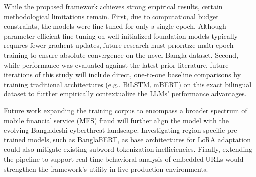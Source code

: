 \documentclass[journal]{IEEEtran}
\begin{document}
While the proposed framework achieves strong empirical results, certain methodological limitations remain. First, due to computational budget constraints, the models were fine-tuned for only a single epoch. Although parameter-efficient fine-tuning on well-initialized foundation models typically requires fewer gradient updates, future research must prioritize multi-epoch training to ensure absolute convergence on the novel Bangla dataset. Second, while performance was evaluated against the latest prior literature, future iterations of this study will include direct, one-to-one baseline comparisons by training traditional architectures (e.g., BiLSTM, mBERT) on this exact bilingual dataset to further empirically contextualize the LLMs' performance advantages.

Future work expanding the training corpus to encompass a broader spectrum of mobile financial service (MFS) fraud will further align the model with the evolving Bangladeshi cyberthreat landscape. Investigating region-specific pre-trained models, such as BanglaBERT, as base architectures for LoRA adaptation could also mitigate existing subword tokenization inefficiencies. Finally, extending the pipeline to support real-time behavioral analysis of embedded URLs would strengthen the framework's utility in live production environments.






\end{document}
